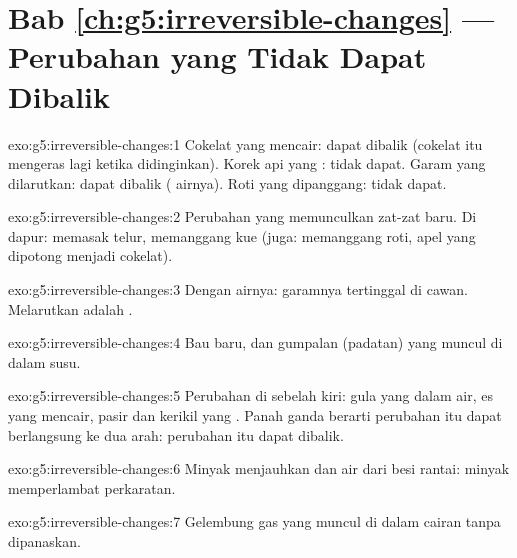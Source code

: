 \section*{Bab \ref{ch:g5:irreversible-changes} --- Perubahan yang Tidak Dapat Dibalik}

\begin{solution}{exo:g5:irreversible-changes:1}
Cokelat yang mencair: dapat dibalik (cokelat itu mengeras lagi ketika
didinginkan). Korek api yang : tidak dapat. Garam yang
dilarutkan: dapat dibalik ( airnya). Roti yang dipanggang: tidak
dapat.
\end{solution}

\begin{solution}{exo:g5:irreversible-changes:2}
Perubahan yang memunculkan zat-zat baru. Di dapur: memasak telur,
memanggang kue (juga: memanggang roti, apel yang dipotong menjadi
cokelat).
\end{solution}

\begin{solution}{exo:g5:irreversible-changes:3}
Dengan  airnya: garamnya tertinggal di cawan. Melarutkan
adalah .
\end{solution}

\begin{solution}{exo:g5:irreversible-changes:4}
Bau baru, dan gumpalan (padatan) yang muncul di dalam susu.
\end{solution}

\begin{solution}{exo:g5:irreversible-changes:5}
Perubahan di sebelah kiri: gula yang  dalam air, es yang mencair,
pasir dan kerikil yang . Panah ganda berarti perubahan itu dapat
berlangsung ke dua arah: perubahan itu dapat dibalik.
\end{solution}

\begin{solution}{exo:g5:irreversible-changes:6}
Minyak menjauhkan  dan air dari besi rantai: minyak memperlambat
perkaratan.
\end{solution}

\begin{solution}{exo:g5:irreversible-changes:7}
Gelembung gas yang muncul di dalam cairan tanpa dipanaskan.
\end{solution}

